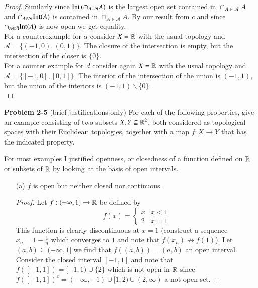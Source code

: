 \documentclass[minion]{homework651}
\begin{document}
\begin{problems}
\begin{enumerate}
\begin{proof}
        Similarly since $\text{Int}\left(\cap_{A \in \mathcal{A}}A\right)$ is the largest open set contained in $\cap_{A \in \mathcal{A}}A$ and 
        $\cap_{A \in \mathcal{A}}\text{Int}(A)$ is contained in $\cap_{A \in \mathcal{A}}A$. By our result from $c$ and since $\cap_{A \in \mathcal{A}}\text{Int}(A)$ is 
        now open we get equality. \\
    

        For a counterexample for $a$ consider $X = \mathbb R$ with the usual topology and $\mathcal{A} = \{(-1, 0),(0, 1)\}$. The closure of the intersection is empty, but the intersection of the closer is $\{0\}$.\\


        For a counter example for $d$ consider again  $X = \mathbb R$ with the usual topology and $\mathcal{A} = \{[-1, 0],[0, 1]\}$. The interior of the intersection of the union is $(-1,1)$, but the union of the interiors is $(-1, 1)\backslash \{0\}$.\\




        
    \end{proof}

\end{enumerate}





\problem \textbf{Problem 2-5} (brief justifications only) For each of the following properties, give an example 
consisting of two subsets $X, Y \subseteq \mathbb R^2$, both considered as topological spaces with their Euclidean 
topologies, together with a map $f: X \to Y$ that has the indicated property. 

For most examples I justified openness, or closedness of a function defined on $\mathbb R$ or subsets of $\mathbb R$ by looking at
the basis of open intervals. 
\begin{enumerate}
    \item[(a)] $f$ is open but neither closed nor continuous.
    \begin{proof} Let $f: (-\infty, 1] \to \mathbb R$ be defined by 
        \begin{equation*}
            f(x) = \begin{cases} 
                x & x < 1 \\
                2 & x = 1
             \end{cases}
        \end{equation*}    
        This function is clearly discontinuous at $x = 1$ (construct a sequence $x_n = 1 - \frac{1}{n}$ which converges to $1$ and note that $f(x_n) \not\to f(1)$). Let $(a, b) \subseteq (-\infty, 1]$ we find that $f((a, b)) = (a, b)$ an open interval. 
        Consider the closed interval $[-1, 1]$ and note that $f([-1, 1]) = [-1,1) \cup \{2\}$ which is not open in $\mathbb R$ since $f([-1,1])^c = (-\infty, -1) \cup [1, 2) \cup (2, \infty)$ a 
        not open set.  
    \end{proof}



\end{enumerate}
\end{problems}
\end{document}
